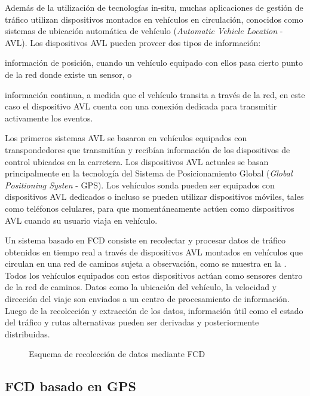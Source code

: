 Además de la utilización de tecnologías in-situ, muchas aplicaciones de gestión de tráfico utilizan dispositivos montados en vehículos en circulación, conocidos como sistemas de ubicación automática de vehículo (\emph{Automatic Vehicle Location} - AVL). Los dispositivos AVL pueden proveer dos tipos de información: \begin{enumerate*}[a)]
\item información de posición, cuando un vehículo equipado con ellos pasa cierto punto de la red donde existe un sensor, o \item información continua, a medida que el vehículo transita a través de la red, en este caso el dispositivo AVL cuenta con una conexión dedicada para transmitir activamente los eventos.
\end{enumerate*}

Los primeros sistemas AVL se basaron en vehículos equipados con transpondedores que transmitían y recibían información de los dispositivos de control ubicados en la carretera. Los dispositivos AVL actuales se basan principalmente en la tecnología del Sistema de Posicionamiento Global (\emph{Global Positioning Systen} - GPS). Los vehículos sonda pueden ser equipados con dispositivos AVL dedicados o incluso se pueden utilizar dispositivos móviles, tales como teléfonos celulares, para que momentáneamente actúen como dispositivos AVL cuando su usuario viaja en vehículo.  

Un sistema basado en FCD consiste en recolectar y procesar datos de tráfico obtenidos en tiempo real a través de dispositivos AVL montados en vehículos que circulan en una red de caminos sujeta a observación, como se muestra en la . Todos los vehículos equipados con estos dispositivos actúan como sensores dentro de la red de caminos. Datos como la ubicación del vehículo, la velocidad y dirección del viaje son enviados a un centro de procesamiento de información. Luego de la recolección y extracción de los datos, información útil como el estado del tráfico y rutas alternativas pueden ser derivadas y posteriormente distribuidas.

\begin{figure}[h]
	\centering
	
	\caption{Esquema de recolección de datos mediante FCD}
	\label{fig:ComunicacionGPS} 	
\end{figure}

\subsection{FCD basado en GPS}

